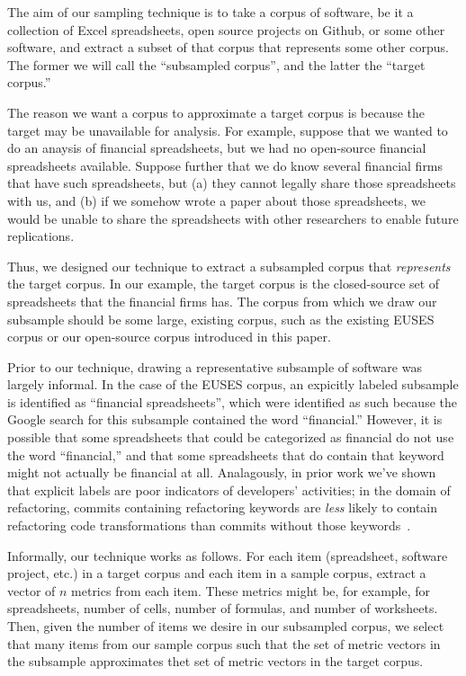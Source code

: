 \documentclass[conference]{IEEEtran}
\begin{document}
The aim of our sampling technique is to take a corpus of software, be it 
a collection of Excel spreadsheets, open source projects on Github, 
or some other software, and extract a subset of that corpus that represents
some other corpus.
The former we will call the ``subsampled corpus'', and the latter the
``target corpus.''

The reason we want a corpus to approximate a target corpus is because the 
target may be unavailable for analysis.
For example, suppose that we wanted to do an anaysis of financial spreadsheets,
but we had no open-source financial spreadsheets available.
Suppose further that we do know several financial firms that have such spreadsheets,
but (a) they cannot legally share those spreadsheets with us, and (b) if we somehow wrote a paper
about those spreadsheets, we would be unable to share the spreadsheets with other researchers
to enable future replications.

Thus, we designed our technique to extract a subsampled corpus that \emph{represents}
the target corpus.
In our example, the target corpus is the closed-source set of spreadsheets that the 
financial firms has.
The corpus from which we draw our subsample should be some large, existing corpus, such
as the existing EUSES corpus or our open-source corpus introduced in this paper.


Prior to our technique, drawing a representative subsample of software was largely
informal.
In the case of the EUSES corpus, an expicitly labeled subsample is identified as ``financial spreadsheets'',
which were identified as such because the Google search for this subsample
contained the word ``financial.''
However, it is possible that some spreadsheets that could be categorized as financial do not
use the word ``financial,'' and that some spreadsheets that do contain that keyword might not
actually be financial at all.
Analagously, in prior work we've shown that explicit labels are poor indicators of developers'
activities; in the domain of refactoring, commits containing refactoring keywords are \emph{less}
likely to contain refactoring code transformations than commits without those keywords~\cite{HowWeRefactor}.


Informally, our technique works as follows.
For each item (spreadsheet, software project, etc.) in a target corpus and each
item in a sample corpus, extract a vector of $n$ metrics from each item.
These metrics might be, for example, for spreadsheets, number of cells,
number of formulas, and number of worksheets.
Then, given the number of items we desire in our subsampled corpus,
we select that many items from our sample corpus such that
the set of metric vectors in the subsample approximates thet set
of metric vectors in the target corpus.
\end{document}
